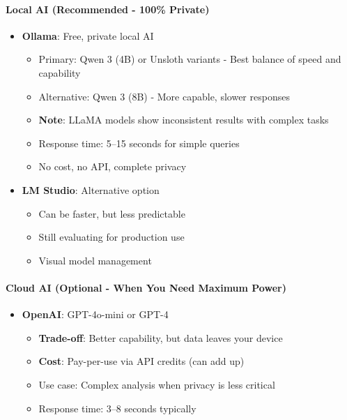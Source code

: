 \documentclass[11pt,letterpaper]{article}
\begin{document}
\paragraph{Local AI (Recommended - 100\% Private)}
\begin{itemize}[leftmargin=*]
    \item \textbf{Ollama}: Free, private local AI
    \begin{itemize}
        \item Primary: Qwen 3 (4B) or Unsloth variants - Best balance of speed and capability
        \item Alternative: Qwen 3 (8B) - More capable, slower responses
        \item \textbf{Note}: LLaMA models show inconsistent results with complex tasks
        \item Response time: 5--15 seconds for simple queries
        \item No cost, no API, complete privacy
    \end{itemize}

    \item \textbf{LM Studio}: Alternative option
    \begin{itemize}
        \item Can be faster, but less predictable
        \item Still evaluating for production use
        \item Visual model management
    \end{itemize}
\end{itemize}

\paragraph{Cloud AI (Optional - When You Need Maximum Power)}
\begin{itemize}[leftmargin=*]
    \item \textbf{OpenAI}: GPT-4o-mini or GPT-4
    \begin{itemize}
        \item \textbf{Trade-off}: Better capability, but data leaves your device
        \item \textbf{Cost}: Pay-per-use via API credits (can add up)
        \item Use case: Complex analysis when privacy is less critical
        \item Response time: 3--8 seconds typically
    \end{itemize}
\end{itemize}
\end{document}
